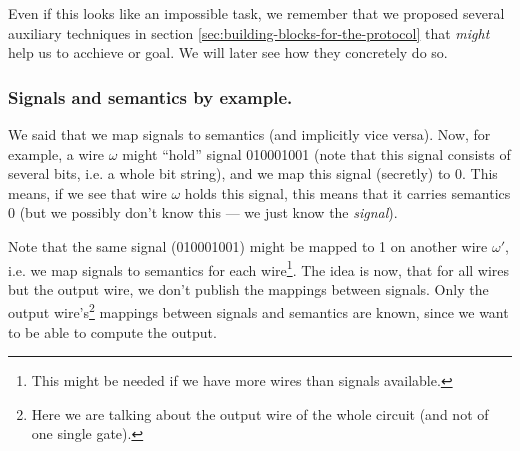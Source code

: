 \message{ !name(seminar.tex)}\documentclass{llncs}
\newcommand{\todo}[1]{ {\color{red}{\textbf{#1}}}}
\begin{document}
Even if this looks like an impossible task, we remember that we proposed several auxiliary techniques in section \ref{sec:building-blocks-for-the-protocol} that \emph{might} help us to acchieve or goal. We will later see how they concretely do so.

\subsubsection{Signals and semantics by example.}
\label{sec:signals-semantics-by-example}

We said that we map signals to semantics (and implicitly vice versa). Now, for example, a wire $\omega$ might ``hold'' signal 010001001 (note that this signal consists of several bits, i.e. a whole bit string), and we map this signal (secretly) to 0. This means, if we see that wire $\omega$ holds this signal, this means that it carries semantics 0 (but we possibly don't know this --- we just know the \emph{signal}).

Note that the same signal (010001001) might be mapped to 1 on another wire $\omega'$, i.e. we map signals to semantics for each wire\footnote{This might be needed if we have more wires than signals available.}. The idea is now, that for all wires but the output wire, we don't publish the mappings between signals. Only the output wire's\footnote{Here we are talking about the output wire of the whole circuit (and not of one single gate).} mappings between signals and semantics are known, since we want to be able to compute the output.

\end{document}

